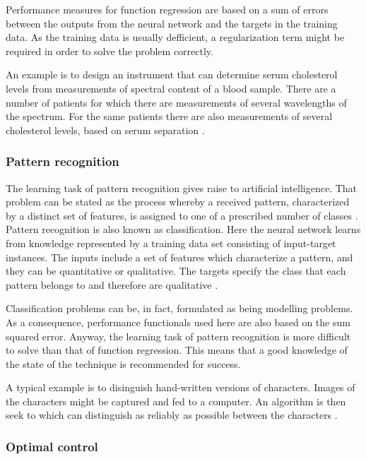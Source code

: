 Performance measures for function regression are based on a sum of errors between the outputs from the neural network and the targets in the training data. 
As the training data is usually defficient, a regularization term might be required in order to solve the problem correctly.  

An example is to design an instrument that can determine serum cholesterol levels from
measurements of spectral content of a blood sample. There are a number of 
patients for which there are measurements of several wavelengths of the spectrum.
For the same patients there are also measurements of several
cholesterol levels, based on serum separation \cite{Demuth2009}. 

\subsubsection{Pattern recognition}

The learning task of pattern recognition gives raise to artificial intelligence. That problem can be stated as
the process whereby a received pattern, characterized by a distinct
set of features, is assigned to one of a prescribed number of
classes \cite{Haykin1994}. Pattern recognition is also known as classification. Here
the neural network learns from knowledge represented by a training
data set consisting of input-target instances. The inputs include a
set of features which characterize a pattern, and they can be quantitative or qualitative. The targets specify
the class that each pattern belongs to and therefore are qualitative \cite{Bishop1995}.

Classification problems can be, in fact, formulated as being modelling problems. 
As a consequence, performance functionals used here are also based on the sum squared error. 
Anyway, the learning task of pattern recognition is more difficult to solve than that of function regression. 
This means that a good knowledge of the state of the technique is recommended for success. 

A typical example is to disinguish hand-written versions of characters. 
Images of the characters might be captured and fed to a computer. 
An algorithm is then seek to which can distinguish as reliably as possible between the characters \cite{Bishop1995}. 

\subsubsection{Optimal control}


